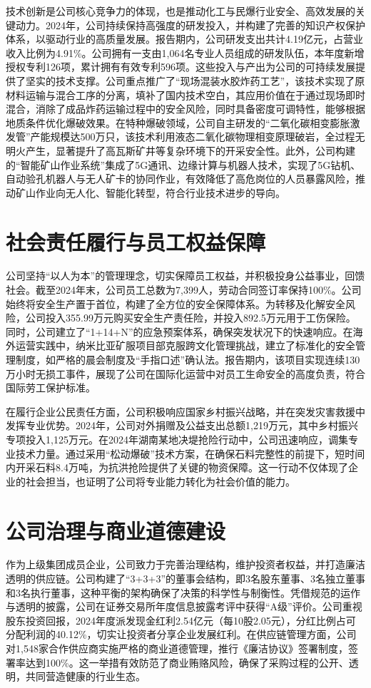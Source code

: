 \documentclass[a4paper,12pt]{article}
\begin{document}
技术创新是公司核心竞争力的体现，也是推动化工与民爆行业安全、高效发展的关键动力。2024年，公司持续保持高强度的研发投入，并构建了完善的知识产权保护体系，以驱动行业的高质量发展。报告期内，公司研发支出共计4.19亿元，占营业收入比例为4.91\%。公司拥有一支由1,064名专业人员组成的研发队伍，本年度新增授权专利126项，累计拥有有效专利596项。这些投入与产出为公司的可持续发展提供了坚实的技术支撑。公司重点推广了“现场混装水胶炸药工艺”，该技术实现了原材料运输与混合工序的分离，填补了国内技术空白，其应用价值在于通过现场即时混合，消除了成品炸药运输过程中的安全风险，同时具备密度可调特性，能够根据地质条件优化爆破效果。在特种爆破领域，公司自主研发的“二氧化碳相变膨胀激发管”产能规模达500万只，该技术利用液态二氧化碳物理相变原理破岩，全过程无明火产生，显著提升了高瓦斯矿井等复杂环境下的开采安全性。此外，公司构建的“智能矿山作业系统”集成了5G通讯、边缘计算与机器人技术，实现了5G钻机、自动验孔机器人与无人矿卡的协同作业，有效降低了高危岗位的人员暴露风险，推动矿山作业向无人化、智能化转型，符合行业技术进步的导向。

\section{社会责任履行与员工权益保障}

公司坚持“以人为本”的管理理念，切实保障员工权益，并积极投身公益事业，回馈社会。截至2024年末，公司员工总数为7,399人，劳动合同签订率保持100\%。公司始终将安全生产置于首位，构建了全方位的安全保障体系。为转移及化解安全风险，公司投入355.99万元购买安全生产责任险，并投入892.5万元用于工伤保险。同时，公司建立了“1+14+N”的应急预案体系，确保突发状况下的快速响应。在海外运营实践中，纳米比亚矿服项目部克服跨文化管理挑战，建立了标准化的安全管理制度，如严格的晨会制度及“手指口述”确认法。报告期内，该项目实现连续130万小时无损工事件，展现了公司在国际化运营中对员工生命安全的高度负责，符合国际劳工保护标准。

在履行企业公民责任方面，公司积极响应国家乡村振兴战略，并在突发灾害救援中发挥专业优势。2024年，公司对外捐赠及公益支出总额1,219万元，其中乡村振兴专项投入1,125万元。在2024年湖南某地决堤抢险行动中，公司迅速响应，调集专业技术力量。通过采用“松动爆破”技术方案，在确保石料完整性的前提下，短时间内开采石料8.4万吨，为抗洪抢险提供了关键的物资保障。这一行动不仅体现了企业的社会担当，也证明了公司将专业能力转化为社会价值的能力。

\section{公司治理与商业道德建设}

作为上级集团成员企业，公司致力于完善治理结构，维护投资者权益，并打造廉洁透明的供应链。公司构建了“3+3+3”的董事会结构，即3名股东董事、3名独立董事和3名执行董事，这种平衡的架构确保了决策的科学性与制衡性。凭借规范的运作与透明的披露，公司在证券交易所年度信息披露考评中获得“A级”评价。公司重视股东投资回报，2024年度派发现金红利2.54亿元（每10股2.05元），分红比例占可分配利润的40.12\%，切实让投资者分享企业发展红利。在供应链管理方面，公司对1,548家合作供应商实施严格的商业道德管理，推行《廉洁协议》签署制度，签署率达到100\%。这一举措有效防范了商业贿赂风险，确保了采购过程的公开、透明，共同营造健康的行业生态。
\end{document}
